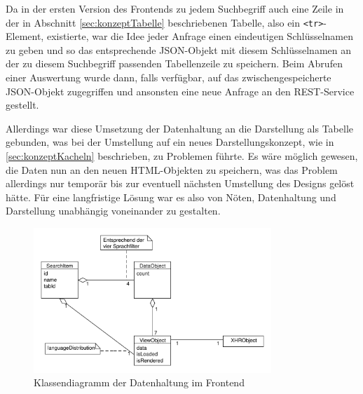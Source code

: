 Da in der ersten Version des Frontends zu jedem Suchbegriff auch eine Zeile in der in Abschnitt \ref{sec:konzeptTabelle} beschriebenen Tabelle, also ein \texttt{<tr>}-Element, existierte, war die Idee jeder Anfrage einen eindeutigen Schlüsselnamen zu geben und so das entsprechende JSON-Objekt mit diesem Schlüsselnamen an der zu diesem Suchbegriff passenden Tabellenzeile zu speichern. Beim Abrufen einer Auswertung wurde dann, falls verfügbar, auf das zwischengespeicherte JSON-Objekt zugegriffen und ansonsten eine neue Anfrage an den REST-Service gestellt.

Allerdings war diese Umsetzung der Datenhaltung an die Darstellung als Tabelle gebunden, was bei der Umstellung auf ein neues Darstellungskonzept, wie in \ref{sec:konzeptKacheln} beschrieben, zu Problemen führte. Es wäre möglich gewesen, die Daten nun an den neuen HTML-Objekten zu speichern, was das Problem allerdings nur temporär bis zur eventuell nächsten Umstellung des Designs gelöst hätte.
Für eine langfristige Lösung war es also von Nöten, Datenhaltung und Darstellung unabhängig voneinander zu gestalten.

\begin{figure}
 \centering
 \includegraphics[width=0.8\textwidth]{./Bilder/Frontend/classDiagram.pdf}
\caption{Klassendiagramm der Datenhaltung im Frontend}
\label{img:FrontEndClassDiagram}
\end{figure} 

